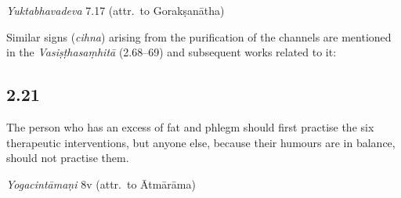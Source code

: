 \begin{ekdosis}
\begin{testimonia}[hp02_020]
\emph{Yuktabhavadeva} 7.17 (attr.~to Gorakṣanātha)

\begin{versinnote}
\end{versinnote}

\end{testimonia}

\begin{philcomm}[hp02_020]
Similar signs (\emph{cihna}) arising from the purification of the channels are mentioned in the \emph{Vasiṣṭhasaṃhitā} (2.68--69) and subsequent works related to it:

\begin{versinnote}
\end{versinnote}

\end{philcomm}

\subsection*{2.21}
\begin{translation}[hp02_021]
The person who has an excess of fat and phlegm should first practise the six therapeutic interventions, but anyone else, because their humours are in balance, should not practise them.
\end{translation}

\begin{sources}[hp02_021]
\end{sources}

\begin{testimonia}[hp02_021]
\emph{Yogacintāmaṇi} 8v (attr.~to Ātmārāma)

\begin{versinnote}
\end{versinnote}


\end{testimonia}
\end{ekdosis}
